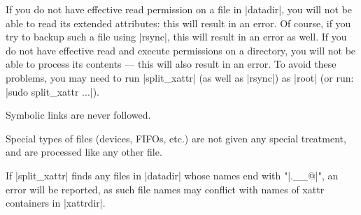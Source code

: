 \documentclass[11pt]{article}
\begin{document}
If you do not have effective read permission on a file in |datadir|,
you will not be able to read its extended attributes:
this will result in an error.
Of course, if you try to backup such a file using |rsync|,
this will result in an error as well.
If you do not have effective read and execute permissions on a directory,
you will not be able to process its contents --- this will also result
in an error.
To avoid these problems, you may need to run |split_xattr| 
(as well as |rsync|) as |root|
(or run: |sudo split_xattr ...|).

Symbolic links are never followed.


Special types of files (devices, FIFOs, etc.) are not given
any special treatment, and are processed like any other file.

If |split_xattr| finds any files in |datadir| whose names end with "|.__@|",
an error will be reported, as such file names may conflict with
names of xattr containers in |xattrdir|.
\end{document}
